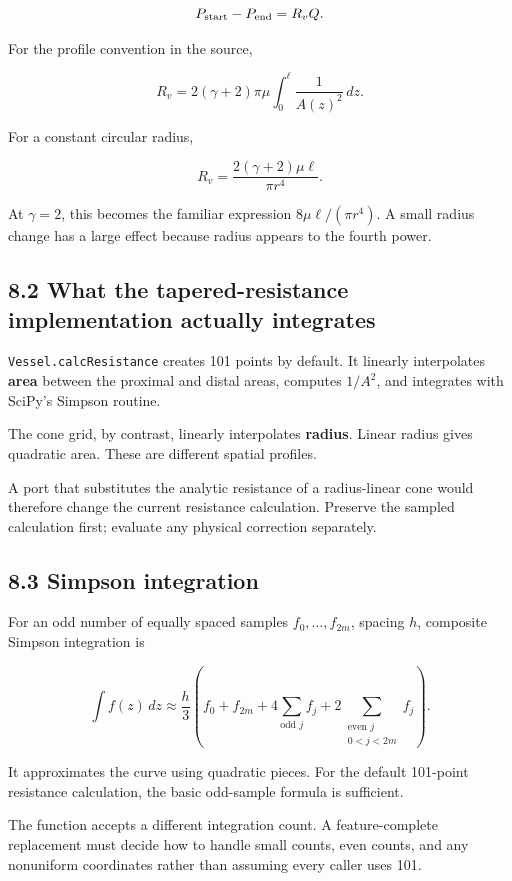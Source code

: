 \documentclass[11pt,a4paper]{article}
\begin{document}
\begingroup\small
\[
P_{\rm start}-P_{\rm end}=R_vQ.
\]
\endgroup


For the profile convention in the source,


\begingroup\small
\[
R_v=2(\gamma+2)\pi\mu
\int_0^\ell\frac{1}{A(z)^2}\,dz.
\]
\endgroup


For a constant circular radius,


\begingroup\small
\[
R_v=\frac{2(\gamma+2)\mu\ell}{\pi r^4}.
\]
\endgroup


At \(\gamma=2\), this becomes the familiar expression \(8\mu\ell/(\pi r^4)\). A small radius change has a large effect because radius appears to the fourth power.

\subsection{8.2 What the tapered-resistance implementation actually integrates}
\texttt{Vessel.\allowbreak{}calcResistance} creates 101 points by default. It linearly interpolates \textbf{area} between the proximal and distal areas, computes \(1/A^2\), and integrates with SciPy's Simpson routine.

The cone grid, by contrast, linearly interpolates \textbf{radius}. Linear radius gives quadratic area. These are different spatial profiles.

A port that substitutes the analytic resistance of a radius-linear cone would therefore change the current resistance calculation. Preserve the sampled calculation first; evaluate any physical correction separately.

\subsection{8.3 Simpson integration}
For an odd number of equally spaced samples \(f_0,\ldots,f_{2m}\), spacing \(h\), composite Simpson integration is


\begingroup\small
\[
\int f(z)\,dz\approx
\frac h3\left(
f_0+f_{2m}
+4\sum_{\text{odd }j} f_j
+2\sum_{\substack{\text{even }j\\0<j<2m}} f_j
\right).
\]
\endgroup


It approximates the curve using quadratic pieces. For the default 101-point resistance calculation, the basic odd-sample formula is sufficient.

The function accepts a different integration count. A feature-complete replacement must decide how to handle small counts, even counts, and any nonuniform coordinates rather than assuming every caller uses 101.
\end{document}
